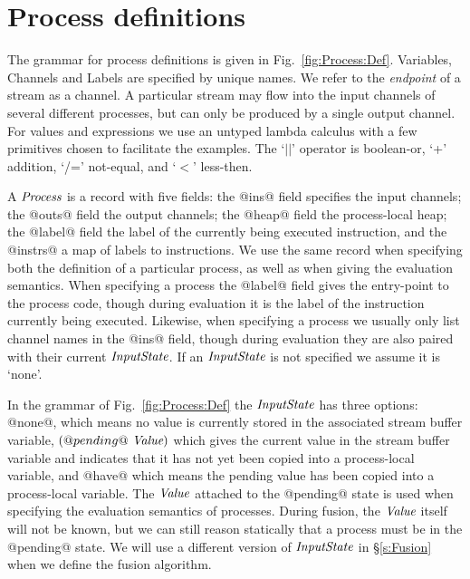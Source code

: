 
\clearpage{}
\section{Process definitions}


The grammar for process definitions is given in Fig.~\ref{fig:Process:Def}. Variables, Channels and Labels are specified by unique names. We refer to the \emph{endpoint} of a stream as a channel. A particular stream may flow into the input channels of several different processes, but can only be produced by a single output channel. For values and expressions we use an untyped lambda calculus with a few primitives chosen to facilitate the examples. The `$||$' operator is boolean-or, `+' addition, `/=' not-equal, and `$<$' less-then.

A $\textit{Process}$ is a record with five fields: the @ins@ field specifies the input channels; the @outs@ field the output channels; the @heap@ field the process-local heap; the @label@ field the label of the currently being executed instruction, and the @instrs@ a map of labels to instructions. We use the same record when specifying both the definition of a particular process, as well as when giving the evaluation semantics. When specifying a process the @label@ field gives the entry-point to the process code, though during evaluation it is the label of the instruction currently being executed. Likewise, when specifying a process we usually only list channel names in the @ins@ field, though during evaluation they are also paired with their current $\textit{InputState}$. If an $\textit{InputState}$ is not specified we assume it is `none'.

In the grammar of Fig.~\ref{fig:Process:Def} the $\textit{InputState}$ has three options: @none@, which means no value is currently stored in the associated stream buffer variable, $(@pending@~\textit{Value})$ which gives the current value in the stream buffer variable and indicates that it has not yet been copied into a process-local variable, and @have@ which means the pending value has been copied into a process-local variable. The $\textit{Value}$ attached to the @pending@ state is used when specifying the evaluation semantics of processes. During fusion, the $\textit{Value}$ itself will not be known, but we can still reason statically that a process must be in the @pending@ state. We will use a different version of $\textit{InputState}$ in \S\ref{s:Fusion} when we define the fusion algorithm.

